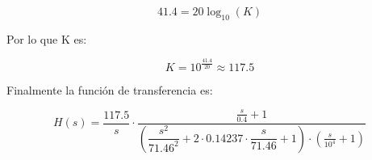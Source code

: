 \begin{equation*}
    41{.}4 = 20\log_{10}(K)   
\end{equation*}

Por lo que K es:

\begin{equation*}
    K = 10 ^{\frac{41{.}4}{20}}  \approx 117{.}5
\end{equation*}

Finalmente la función de transferencia es\@: 

\begin{equation*}
    H(s) = \dfrac{117{.}5}{s} \cdot \dfrac{\frac{s}{0{.}4} + 1}{
        \left(
            \dfrac{s^2}{71{.}46^2} 
            + 2\cdot 0{.}14237 \cdot \dfrac{s}{71{.}46} + 1 
        \right) \cdot (\frac{s}{10^4} + 1)
        }
\end{equation*}
